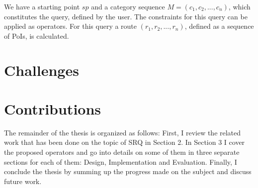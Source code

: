 We have a starting point $sp$ and a category sequence $M = (c_1, c_2, ..., c_n)$, which constitutes the query, defined by the user. The constraints for this query can be applied as operators.
For this query a route $(r_1, r_2, ..., r_n)$, defined as a sequence of PoIs, is calculated. \newline

\section{Challenges}

\section{Contributions}

The remainder of the thesis is organized as follows: First, I review the related work that has been done on the topic of SRQ in Section 2. In Section 3 I cover the proposed operators and go into details on some of them in three separate sections for each of them: Design, Implementation and Evaluation. Finally, I conclude the thesis by summing up the progress made on the subject and discuss future work.